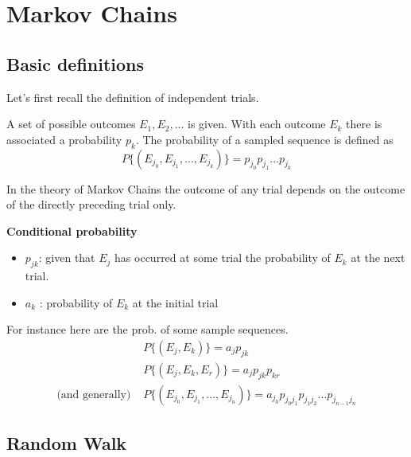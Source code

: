 \chapter{Markov Chains}
\section{Basic definitions}
Let's first recall the definition of independent trials.

A set of possible outcomes $E_1,E_2,...$ is given. With each outcome $E_k$ there is associated a probability $p_k$. The probability of a sampled sequence is defined as
$$ P\{(E_{j_0},E_{j_1},...,E_{j_k})\} = p_{j_0} p_{j_1} \hdots p_{j_k}$$

\medskip
\noindent In the theory of Markov Chains the outcome of any trial depends on the outcome of the directly preceding trial only. 

\medskip
\noindent \textbf{Conditional probability}
\begin{itemize}
    \item $p_{jk}$: given that $E_j$ has occurred at some trial the probability of $E_k$ at the next trial.
    \item $a_k$ : probability of $E_k$ at the initial trial 
\end{itemize}
For instance here are the prob. of some sample sequences.
\begin{align*}
    &P\{(E_j,E_k)\} = a_j p_{jk}\\
    &P\{(E_j,E_k,E_r) \} = a_j p_{jk} p_{kr}\\
    \textrm{(and generally) }& P\{(E_{j_0},E_{j_1},...,E_{j_n})\} = a_{j_0} p_{j_0 j_1} p_{j_1 j_2} \hdots p_{j_{n-1} j_n}
\end{align*}

\section{Random Walk}